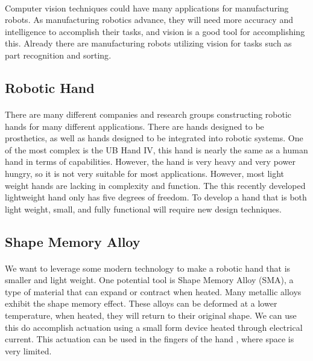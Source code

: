 \documentclass[titlepage,letterpaper,12pt]{article}
\begin{document}
\paragraph{}Computer vision techniques could have many applications for
manufacturing robots. As manufacturing robotics advance, they will need more
accuracy and intelligence to accomplish their tasks, and vision is a good tool
for accomplishing this. Already there are manufacturing robots utilizing vision
for tasks such as part recognition and sorting\cite{SIRfuture}.

\subsection{Robotic Hand}
\paragraph{}There are many different companies and research groups constructing
robotic hands for many different applications. There are hands designed to be
prosthetics, as well as hands designed to be integrated into robotic systems.
One of the most complex is the UB Hand IV, this hand is nearly the same as a
human hand in terms of capabilities. However, the hand is very heavy and very
power hungry, so it is not very suitable for most
applications\cite{Melchiorri2013}. However, most light weight hands are lacking
in complexity and function. The this recently developed lightweight hand only
has five degrees of freedom\cite{takaki2011high}. To develop a hand that is both
light weight, small, and fully functional will require new design techniques. 

\subsection{Shape Memory Alloy}
\paragraph{}We want to leverage some modern technology to make a robotic hand
that is smaller and light weight. One potential tool is Shape Memory Alloy
(SMA), a type of material that can expand or contract when
heated\cite{Schetky1982}. Many metallic alloys exhibit the shape memory
effect\cite{Wayman1993}. These alloys can be deformed at a lower temperature,
when heated, they will return to their original shape. We can use this do
accomplish actuation using a small form device heated through electrical
current\cite{Ikuta1990}. This actuation can be used in the fingers of the hand
, where space is very limited.
\end{document}
